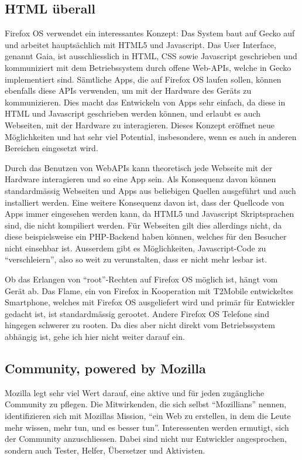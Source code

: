 \subsection{HTML überall}
Firefox OS verwendet ein interessantes Konzept: Das System baut auf Gecko auf und arbeitet hauptsächlich mit HTML5 und Javascript. Das User Interface, genannt Gaia, ist ausschliesslich in HTML, CSS sowie Javascript geschrieben und kommuniziert mit dem Betriebssystem durch offene Web-APIs, welche in Gecko implementiert sind\thinspace\cite{online:ff-gaia}. Sämtliche Apps, die auf Firefox OS laufen sollen, können ebenfalls diese APIs verwenden, um mit der Hardware des Geräts zu kommunizieren\thinspace\cite{online:ff-webapi}. Dies macht das Entwickeln von Apps sehr einfach, da diese in HTML und Javascript geschrieben werden können\thinspace\cite{online:ff-apps}, und erlaubt es auch Webseiten, mit der Hardware zu interagieren. Dieses Konzept eröffnet neue Möglichkeiten und hat sehr viel Potential, insbesondere, wenn es auch in anderen Bereichen eingesetzt wird.

Durch das Benutzen von WebAPIs kann theoretisch jede Webseite mit der Hardware interagieren und so eine App sein. Als Konsequenz davon können standardmässig Webseiten und Apps aus beliebigen Quellen ausgeführt und auch installiert werden. Eine weitere Konsequenz davon ist, dass der Quellcode von Apps immer eingesehen werden kann, da HTML5 und Javascript Skriptsprachen sind, die nicht kompiliert werden. Für Webseiten gilt dies allerdings nicht, da diese beispielsweise ein PHP-Backend haben können, welches für den Besucher nicht einsehbar ist. Ausserdem gibt es Möglichkeiten, Javascript-Code zu ``verschleiern'', also so weit zu verunstalten, dass er nicht mehr lesbar ist\thinspace\cite{online:yui-compressor}.

Ob das Erlangen von ``root''-Rechten auf Firefox OS möglich ist, hängt vom Gerät ab. Das Flame, ein von Firefox in Kooperation mit T2Mobile entwickeltes Smartphone, welches mit Firefox OS ausgeliefert wird und primär für Entwickler gedacht ist\thinspace\cite{online:ff-flame}, ist standardmässig gerootet\thinspace\cite{irc:fxos}.
Andere Firefox OS Telefone sind hingegen schwerer zu rooten\thinspace\cite{irc:fxos}. Da dies aber nicht direkt vom Betriebssystem abhängig ist, gehe ich hier nicht weiter darauf ein.
\newline

\subsection{Community, powered by Mozilla}
Mozilla legt sehr viel Wert darauf, eine aktive und für jeden zugängliche Community zu pflegen\thinspace\cite{online:mozilla-volunteer}. Die Mitwirkenden, die sich selbst ``Mozillians'' nennen, identifizieren sich mit Mozillas Mission, ``ein Web zu erstellen, in dem die Leute mehr wissen, mehr tun, und es besser tun''\thinspace\cite{online:mozilla-community}. 
Interessenten werden ermutigt, sich der Community anzuschliessen. Dabei sind nicht nur Entwickler angesprochen, sondern auch Tester, Helfer, Übersetzer und Aktivisten\thinspace\cite{online:mozilla-get-involved}. 

